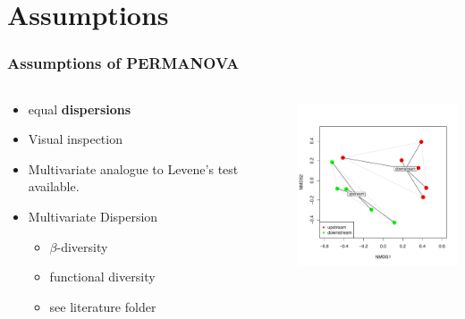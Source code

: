 \documentclass[10pt]{beamer}\usepackage[]{graphicx}\usepackage[]{color}
\newenvironment{knitrout}{}{} %
\renewcommand{\footnotesize}{\scriptsize}
\begin{document}
\section{Assumptions}
\begin{frame}[fragile]
  \frametitle{Assumptions of PERMANOVA}
\begin{columns}
  \begin{column}{5cm}
    \begin{itemize}
      \item equal \textbf{dispersions}
      \item Visual inspection
      \item Multivariate analogue to Levene's test available.\footnotemark
    \end{itemize}
    \pause
    \begin{itemize}
    \item Multivariate Dispersion
      \begin{itemize}
      \item $\beta$-diversity
      \item functional diversity
      \item see literature folder
      \end{itemize}
    \end{itemize}

  \end{column}
  \begin{column}{5cm}
\begin{knitrout}\footnotesize
{}\color{fgcolor}

{\centering \includegraphics[width=5cm,height=5cm]{figs/nmds2_plot2-1} 

}



\end{knitrout}
    \end{column}
  \end{columns}
\end{frame}
\end{document}
